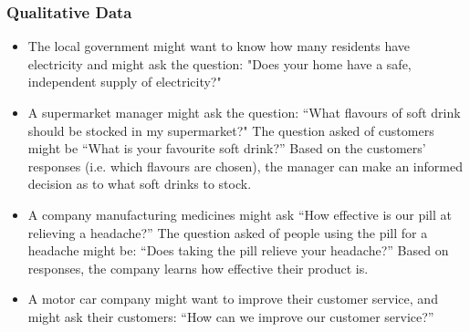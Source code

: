 \begin{description}[noitemsep]
            \subsubsection{ Qualitative Data}
            \nopagebreak
          \label{m39403*id200486}\begin{itemize}[noitemsep]
            \label{m39403*uid9}\item The local government might want to know how many residents have electricity and might ask the question: "Does your home have a safe, independent supply of electricity?"
\label{m39403*uid10}\item A supermarket manager might ask the question: ``What flavours of soft drink should be stocked in my supermarket?" The question asked of customers might be ``What is your favourite soft drink?'' Based on the customers' responses (i.e. which flavours are chosen), the manager can make an informed decision as to what soft drinks to stock.
\label{m39403*uid11}\item A company manufacturing medicines might ask ``How effective is our pill at relieving a headache?'' The question asked of people using the pill for a headache might be: ``Does taking the pill relieve your headache?'' Based on responses, the company learns how effective their product is.
\label{m39403*uid12}\item A motor car company might want to improve their customer service, and might ask their customers: ``How can we improve our customer service?''
\end{itemize}
        \label{m39403*id200551}

\end{description}
